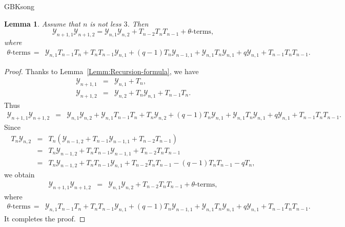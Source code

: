 \documentclass[13pt,a4paper, oneside]{amsart}       %
\numberwithin{equation}{section}
\newtheorem{lemma}[equation]{Lemma}
\theoremstyle{definition}
\theoremstyle{remark}
\begin{document}
\begin{CJK*}{GBK}{song}
\begin{lemma}\label{Lemm:12-recursion}
Assume that $n$ is not less $3$.  Then
\begin{equation*}
 \mathscr{Y}_{n+1,1}\mathscr{Y}_{n+1,2} =\mathscr{Y}_{n,1}\mathscr{Y}_{n,2}+T_{n-2}T_nT_{n-1}+
 \text{$\theta$-terms},
\end{equation*}
where \begin{eqnarray*}
   \text{$\theta$-terms}&=&\mathscr{Y}_{n,1}T_{n-1}T_n+T_nT_{n-1}\mathscr{Y}_{n,1}+
(q-1)T_n\mathscr{Y}_{n-1,1}
 +\mathscr{Y}_{n,1}T_n\mathscr{Y}_{n,1}+q\mathscr{Y}_{n,1}+T_{n-1}T_nT_{n-1}.
      \end{eqnarray*}
\end{lemma}
\begin{proof}Thanks to Lemma~\ref{Lemm:Recursion-formula},  we have
  \begin{eqnarray*}
 \mathscr{Y}_{n+1,1} &=&\mathscr{Y}_{n,1}+T_n,\\
 \mathscr{Y}_{n+1,2} &=&\mathscr{Y}_{n,2}+T_n\mathscr{Y}_{n,1}+T_{n-1}T_n.
  \end{eqnarray*}
  Thus
  \begin{eqnarray*}
 \mathscr{Y}_{n+1,1}\mathscr{Y}_{n+1,2}&=&\mathscr{Y}_{n,1}\mathscr{Y}_{n,2}
 +\mathscr{Y}_{n,1}T_{n-1}T_n+T_n\mathscr{Y}_{n,2}+(q-1)T_n\mathscr{Y}_{n,1}
 +\mathscr{Y}_{n,1}T_n\mathscr{Y}_{n,1}+q\mathscr{Y}_{n,1}+T_{n-1}T_nT_{n-1}.
 \end{eqnarray*}
Since
\begin{eqnarray*}
 T_n\mathscr{Y}_{n,2}&=&
T_n(\mathscr{Y}_{n-1,2}+T_{n-1}\mathscr{Y}_{n-1,1}+T_{n-2}T_{n-1})\\
&=&T_n\mathscr{Y}_{n-1,2}+T_nT_{n-1}\mathscr{Y}_{n-1,1}+T_{n-2}T_nT_{n-1}\\
&=&T_n\mathscr{Y}_{n-1,2}+T_nT_{n-1}\mathscr{Y}_{n,1}+T_{n-2}T_nT_{n-1}
-(q-1)T_nT_{n-1}-qT_n,
 \end{eqnarray*}
we obtain
\begin{eqnarray*}
 \mathscr{Y}_{n+1,1}\mathscr{Y}_{n+1,2}&=&\mathscr{Y}_{n,1}\mathscr{Y}_{n,2}
 +T_{n-2}T_nT_{n-1}+\text{$\theta$-terms},\end{eqnarray*}
where
\begin{eqnarray*}\text{$\theta$-terms}&=&
\mathscr{Y}_{n,1}T_{n-1}T_n+T_nT_{n-1}\mathscr{Y}_{n,1}+
(q-1)T_n\mathscr{Y}_{n-1,1}
 +\mathscr{Y}_{n,1}T_n\mathscr{Y}_{n,1}+q\mathscr{Y}_{n,1}+T_{n-1}T_nT_{n-1}.
 \end{eqnarray*}
It completes the proof.
\end{proof}





\end{CJK*}
\end{document}
